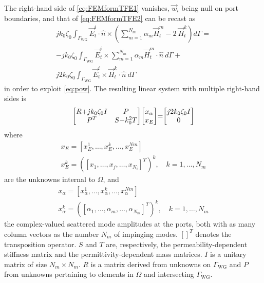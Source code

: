 \documentclass[AMA,STIX2COL]{WileyNJD-v2}
\begin{document}
%
\noindent The right-hand side of \eqref{eq:FEMformTFE1} vanishes,  $\vec{w}_i$ being null on port boundaries, and that of \eqref{eq:FEMformTFE2}  can be recast as
\begin{multline}
 j k_0 \zeta_0 \int_{\Gamma_\text{WG}}  \vec{E}_t^{i} \cdot \hat{n} \times \left( \sum_{m=1}^{N_m} \alpha_m \vec{H}_t^m - 2 \ \vec{H}_t^k \right) d\Gamma = \\
- j k_0 \zeta_0 \int_{\Gamma_\text{WG}} \vec{E}_t^{i} \times  \sum_{m=1}^{N_m} \alpha_m \vec{H}_t^m  \cdot \hat{n} \ d\Gamma + \\
j 2 k_0 \zeta_0 \int_{\Gamma_\text{WG}} \vec{E}_t^{i}  \times \vec{H}_t^k \cdot \hat{n} \ d\Gamma
\end{multline}
\noindent in order to exploit \eqref{eq:pow}. The resulting linear system with multiple right-hand sides is
%
\begin{equation}
\label{eq:FEsys}
\thickmuskip=0mu
\medmuskip=0mu
\thinmuskip=0mu
\begin{bmatrix}
R + jk_0\zeta_0 I & P\\
P^T & S - k_0^2T
\end{bmatrix}
\begin{bmatrix}
x_\alpha \\
x_E
\end{bmatrix} =
\begin{bmatrix}
j2 k_0\zeta_0 I \\
0
\end{bmatrix}
\end{equation}
%
\noindent where 
\begin{gather*} 
\label{eq:xE}
x_E =\left[ x_E^1, \ldots,  x_E^k, \ldots,  x_E^{Nm} \right]\\
x_E^k = \left([x_1, \ldots, x_j, \ldots, x_{N_i}]^T\right)^k, \quad k=1,\ldots,N_m
\end{gather*}
%
\noindent are the unknowns internal to $\Omega$, and 
\begin{gather} 
\label{eq:xA}
x_\alpha =\left[ x_\alpha^1, \ldots,  x_\alpha^k, \ldots,  x_\alpha^{Nm} \right]\\
x_\alpha^k = \left([\alpha_1, \ldots, \alpha_m, \ldots, \alpha_{N_m}]^T\right)^k, \quad k=1,\ldots,N_m
\end{gather}
%
\noindent the complex-valued scattered mode amplitudes at the ports, both with as many column vectors as the number $N_m$ of impinging modes. $[]^T$ denotes the transposition operator. $S$ and $T$ are, respectively, the permeability-dependent stiffness matrix and the permittivity-dependent mass matrices. $I$ is a unitary matrix of size $N_m \times N_m$. $R$ is a matrix derived from unknowns on $\Gamma_\text{WG}$ and $P$ from unknowns pertaining to elements in $\Omega$ and intersecting $\Gamma_\text{WG}$.
\end{document}
